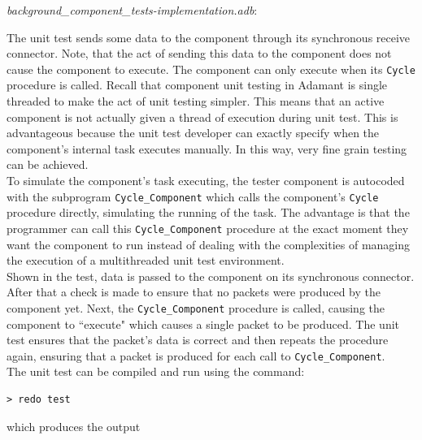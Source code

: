 \textit{background\_component\_tests-implementation.adb}:

The unit test sends some data to the component through its synchronous receive connector. Note, that the act of sending this data to the component does not cause the component to execute. The component can only execute when its \texttt{Cycle} procedure is called. Recall that component unit testing in Adamant is single threaded to make the act of unit testing simpler. This means that an active component is not actually given a thread of execution during unit test. This is advantageous because the unit test developer can exactly specify when the component's internal task executes manually. In this way, very fine grain testing can be achieved. \\

To simulate the component's task executing, the tester component is autocoded with the subprogram \texttt{Cycle\_Component} which calls the component's \texttt{Cycle} procedure directly, simulating the running of the task. The advantage is that the programmer can call this \texttt{Cycle\_Component} procedure at the exact moment they want the component to run instead of dealing with the complexities of managing the execution of a multithreaded unit test environment. \\

Shown in the test, data is passed to the component on its synchronous connector. After that a check is made to ensure that no packets were produced by the component yet. Next, the \texttt{Cycle\_Component} procedure is called, causing the component to ``execute" which causes a single packet to be produced. The unit test ensures that the packet's data is correct and then repeats the procedure again, ensuring that a packet is produced for each call to \texttt{Cycle\_Component}. \\

The unit test can be compiled and run using the command:

\vspace{5mm} %
\begin{verbatim}
> redo test
\end{verbatim}
\vspace{5mm} %

which produces the output

\vspace{5mm} %
\inputminted{text}{../example_architecture/background_component/test/output.txt}
\vspace{5mm} %

